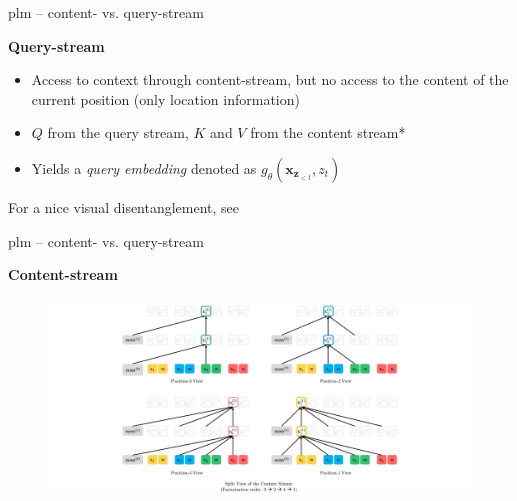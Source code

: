 
\begin{frame}{plm -- content- vs. query-stream}

\vfill
	
	\textbf{Query-stream}
	
	\begin{itemize}
		\item Access to context through content-stream, but no access to the content of the current position (only location information)
		\item $Q$ from the query stream, $K$ and $V$ from the content stream*
		\item Yields a \textit{query embedding} denoted as $g_{\theta}(\mathbf{x}_{\mathbf{z}_{< t}}, z_t)$
	\end{itemize}

\vfill

	{\footnotesize *For a nice visual disentanglement, see }
	
\end{frame}


\begin{frame}{plm -- content- vs. query-stream}

\vfill

	\textbf{Content-stream}
	
	\begin{figure}
		\centering
		\hspace{-2cm}\includegraphics[width = 13cm]{figure/xlnet-content.png}\\ 
	\end{figure}
	
\vfill

\end{frame}

